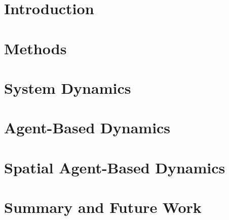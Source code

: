 \documentclass[10pt]{article}
\begin{document}

\section{Introduction}



\section{Methods}



\section{System Dynamics}


\section{Agent-Based Dynamics}



\section{Spatial Agent-Based Dynamics}



%


\section{Summary and Future Work}



%




\end{document}
